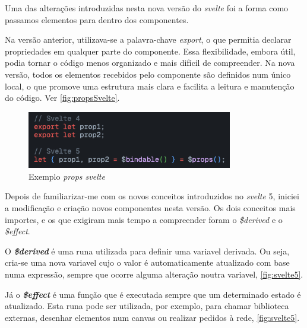Uma das alterações introduzidas nesta nova versão do \textit{svelte} foi a forma como passamos elementos para dentro dos componentes. 

Na versão anterior, utilizava-se a palavra-chave \textit{export}, o que permitia declarar propriedades em qualquer parte do componente. Essa flexibilidade, embora útil, podia tornar o código menos organizado e mais difícil de compreender. Na nova versão, todos os elementos recebidos pelo componente são definidos num único local, o que promove uma estrutura mais clara e facilita a leitura e manutenção do código. Ver \autoref{fig:propsSvelte}.

\clearpage
\begin{figure}[h!]
    \centering
    \includegraphics[width=0.8\textwidth]{figs/props.png}
    \caption{Exemplo \textit{props svelte}}
    \label{fig:propsSvelte}
\end{figure}

Depois de familiarizar-me com os novos conceitos introduzidos no \textit{svelte} 5, iniciei a modificação e criação novos componentes nesta versão. Os dois conceitos mais importes, e os que exigiram mais tempo a compreender foram o \textit{\$derived} e o \textit{\$effect}.

O \textbf{\textit{\$derived}} é uma runa utilizada para definir uma variavel derivada. Ou seja, cria-se uma nova variavel cujo o valor é automaticamente atualizado com base numa expressão, sempre que ocorre alguma alteração noutra variavel, \autoref{fig:svelte5}.

Já o \textbf{\textit{\$effect}} é uma função que é executada sempre que um determinado estado é atualizado. Esta runa pode ser utilizada, por exemplo, para chamar biblioteca externas, desenhar elementos num canvas ou realizar pedidos à rede, \autoref{fig:svelte5}.

